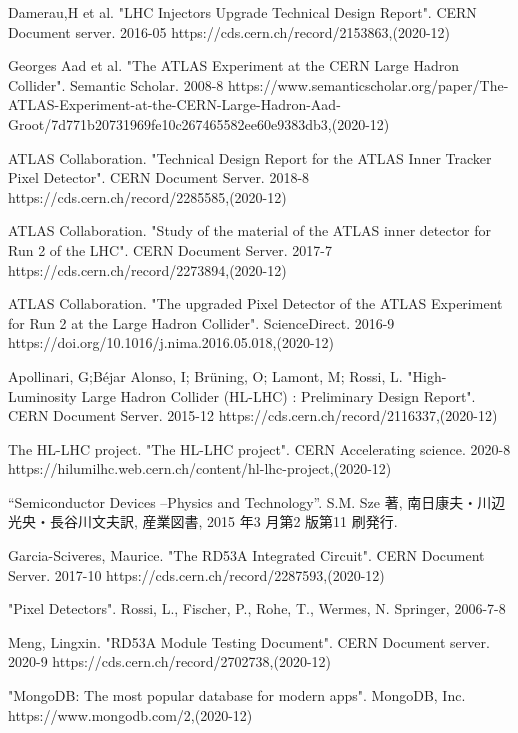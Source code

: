 \begin{thebibliography}{9}

Damerau,H et al. "LHC Injectors Upgrade Technical Design Report". CERN Document server. 2016-05
https://cds.cern.ch/record/2153863,(2020-12)

Georges Aad et al. "The ATLAS Experiment at the CERN Large Hadron Collider". Semantic Scholar. 2008-8
https://www.semanticscholar.org/paper/The-ATLAS-Experiment-at-the-CERN-Large-Hadron-Aad-Groot/7d771b20731969fe10c267465582ee60e9383db3,(2020-12)

ATLAS Collaboration. "Technical Design Report for the ATLAS Inner Tracker Pixel Detector". CERN Document Server. 2018-8
https://cds.cern.ch/record/2285585,(2020-12)

ATLAS Collaboration. "Study of the material of the ATLAS inner detector for Run 2 of the LHC". CERN Document Server. 2017-7
https://cds.cern.ch/record/2273894,(2020-12)

ATLAS Collaboration. "The upgraded Pixel Detector of the ATLAS Experiment for Run 2 at the Large Hadron Collider". ScienceDirect. 2016-9
https://doi.org/10.1016/j.nima.2016.05.018,(2020-12)

Apollinari, G;Béjar Alonso, I; Brüning, O; Lamont, M; Rossi, L. "High-Luminosity Large Hadron Collider (HL-LHC) : Preliminary Design Report". CERN Document Server. 2015-12
https://cds.cern.ch/record/2116337,(2020-12)

The HL-LHC project. "The HL-LHC project". CERN Accelerating science. 2020-8
https://hilumilhc.web.cern.ch/content/hl-lhc-project,(2020-12)

“Semiconductor Devices –Physics and Technology”.
S.M. Sze 著, 南日康夫・川辺光央・長谷川文夫訳, 産業図書, 2015 年3 月第2 版第11 刷発行.

Garcia-Sciveres, Maurice. "The RD53A Integrated Circuit". CERN Document Server. 2017-10
https://cds.cern.ch/record/2287593,(2020-12)

"Pixel Detectors". 
Rossi, L., Fischer, P., Rohe, T., Wermes, N. Springer, 2006-7-8

Meng, Lingxin. "RD53A Module Testing Document". CERN Document server. 2020-9
https://cds.cern.ch/record/2702738,(2020-12)

"MongoDB: The most popular database for modern apps". MongoDB, Inc. 
https://www.mongodb.com/2,(2020-12)


\end{thebibliography}
